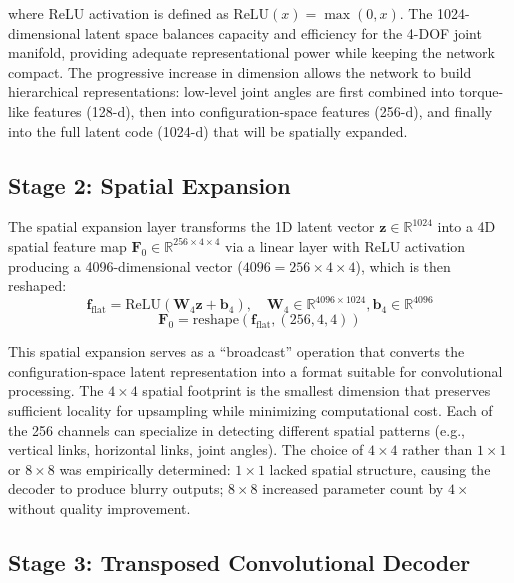 \documentclass[12pt,a4paper,oneside]{report}
\begin{document}
where ReLU activation is defined as $\text{ReLU}(x) = \max(0, x)$. The 1024-dimensional latent space balances capacity and efficiency for the 4-DOF joint manifold, providing adequate representational power while keeping the network compact. The progressive increase in dimension allows the network to build hierarchical representations: low-level joint angles are first combined into torque-like features (128-d), then into configuration-space features (256-d), and finally into the full latent code (1024-d) that will be spatially expanded.
\subsection{Stage 2: Spatial Expansion}
\label{subsec:stage_2_spatial_expansion}

The spatial expansion layer transforms the 1D latent vector $\mathbf{z} \in \mathbb{R}^{1024}$ into a 4D spatial feature map $\mathbf{F}_0 \in \mathbb{R}^{256 \times 4 \times 4}$ via a linear layer with ReLU activation producing a 4096-dimensional vector ($4096 = 256 \times 4 \times 4$), which is then reshaped:
\begin{equation}\mathbf{f}_{\text{flat}} = \text{ReLU}(\mathbf{W}_4 \mathbf{z} + \mathbf{b}_4), \quad \mathbf{W}_4 \in \mathbb{R}^{4096 \times 1024}, \mathbf{b}_4 \in \mathbb{R}^{4096}
\end{equation}
\begin{equation}\mathbf{F}_0 = \text{reshape}(\mathbf{f}_{\text{flat}}, (256, 4, 4))
\end{equation}

This spatial expansion serves as a ``broadcast'' operation that converts the configuration-space latent representation into a format suitable for convolutional processing. The $4 \times 4$ spatial footprint is the smallest dimension that preserves sufficient locality for upsampling while minimizing computational cost. Each of the 256 channels can specialize in detecting different spatial patterns (e.g., vertical links, horizontal links, joint angles). The choice of $4 \times 4$ rather than $1 \times 1$ or $8 \times 8$ was empirically determined: $1 \times 1$ lacked spatial structure, causing the decoder to produce blurry outputs; $8 \times 8$ increased parameter count by $4\times$ without quality improvement.
\subsection{Stage 3: Transposed Convolutional Decoder}
\label{subsec:stage_3_transposed_convolutional_decoder}
\end{document}
